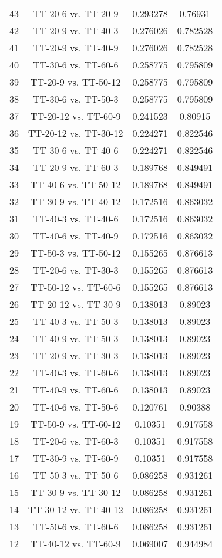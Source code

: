 \documentclass[a4paper,10pt]{article}
\begin{document}
\begin{landscape}
\begin{table}[!htp]
\begin{tabular}{cccc}
43&TT-20-6 vs. TT-20-9&0.293278&0.76931\\
42&TT-20-9 vs. TT-40-3&0.276026&0.782528\\
41&TT-20-9 vs. TT-40-9&0.276026&0.782528\\
40&TT-30-6 vs. TT-60-6&0.258775&0.795809\\
39&TT-20-9 vs. TT-50-12&0.258775&0.795809\\
38&TT-30-6 vs. TT-50-3&0.258775&0.795809\\
37&TT-20-12 vs. TT-60-9&0.241523&0.80915\\
36&TT-20-12 vs. TT-30-12&0.224271&0.822546\\
35&TT-30-6 vs. TT-40-6&0.224271&0.822546\\
34&TT-20-9 vs. TT-60-3&0.189768&0.849491\\
33&TT-40-6 vs. TT-50-12&0.189768&0.849491\\
32&TT-30-9 vs. TT-40-12&0.172516&0.863032\\
31&TT-40-3 vs. TT-40-6&0.172516&0.863032\\
30&TT-40-6 vs. TT-40-9&0.172516&0.863032\\
29&TT-50-3 vs. TT-50-12&0.155265&0.876613\\
28&TT-20-6 vs. TT-30-3&0.155265&0.876613\\
27&TT-50-12 vs. TT-60-6&0.155265&0.876613\\
26&TT-20-12 vs. TT-30-9&0.138013&0.89023\\
25&TT-40-3 vs. TT-50-3&0.138013&0.89023\\
24&TT-40-9 vs. TT-50-3&0.138013&0.89023\\
23&TT-20-9 vs. TT-30-3&0.138013&0.89023\\
22&TT-40-3 vs. TT-60-6&0.138013&0.89023\\
21&TT-40-9 vs. TT-60-6&0.138013&0.89023\\
20&TT-40-6 vs. TT-50-6&0.120761&0.90388\\
19&TT-50-9 vs. TT-60-12&0.10351&0.917558\\
18&TT-20-6 vs. TT-60-3&0.10351&0.917558\\
17&TT-30-9 vs. TT-60-9&0.10351&0.917558\\
16&TT-50-3 vs. TT-50-6&0.086258&0.931261\\
15&TT-30-9 vs. TT-30-12&0.086258&0.931261\\
14&TT-30-12 vs. TT-40-12&0.086258&0.931261\\
13&TT-50-6 vs. TT-60-6&0.086258&0.931261\\
12&TT-40-12 vs. TT-60-9&0.069007&0.944984\\

\end{tabular}
\end{table}
\end{landscape}
\end{document}
